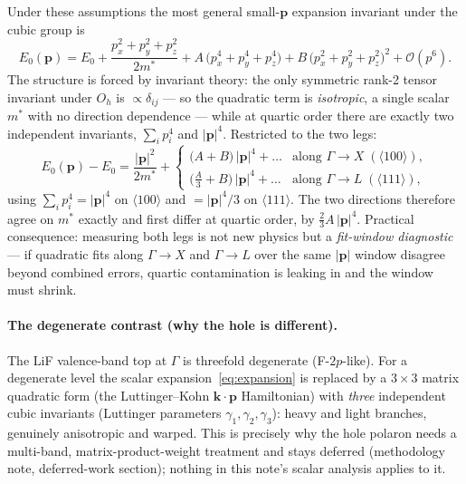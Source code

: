 \documentclass[11pt]{article}
\newcommand{\kv}{\mathbf{k}}
\newcommand{\pv}{\mathbf{p}}
\begin{document}
Under these assumptions the most general small-$\pv$ expansion invariant under the cubic
group is
\begin{equation}
E_{0}(\pv)
= E_{0}
+ \frac{p_{x}^{2}+p_{y}^{2}+p_{z}^{2}}{2m^{*}}
+ A\,\bigl(p_{x}^{4}+p_{y}^{4}+p_{z}^{4}\bigr)
+ B\,\bigl(p_{x}^{2}+p_{y}^{2}+p_{z}^{2}\bigr)^{2}
+ \mathcal{O}(p^{6}).
\label{eq:expansion}
\end{equation}
The structure is forced by invariant theory: the only symmetric rank-2 tensor invariant
under $O_{h}$ is $\propto\delta_{ij}$ --- so the quadratic term is \emph{isotropic}, a
single scalar $m^{*}$ with no direction dependence --- while at quartic order there are
exactly two independent invariants, $\sum_{i}p_{i}^{4}$ and $|\pv|^{4}$. Restricted to
the two legs:
\begin{equation}
E_{0}(\pv)-E_{0}
= \frac{|\pv|^{2}}{2m^{*}} +
\begin{cases}
\bigl(A+B\bigr)\,|\pv|^{4} + \dots & \text{along } \Gamma\to X \;(\langle100\rangle),\\[4pt]
\bigl(\tfrac{A}{3}+B\bigr)\,|\pv|^{4} + \dots & \text{along } \Gamma\to L \;(\langle111\rangle),
\end{cases}
\label{eq:legs}
\end{equation}
using $\sum_{i}p_{i}^{4}=|\pv|^{4}$ on $\langle100\rangle$ and $=|\pv|^{4}/3$ on
$\langle111\rangle$. The two directions therefore agree on $m^{*}$ exactly and first
differ at quartic order, by $\tfrac{2}{3}A\,|\pv|^{4}$. Practical consequence: measuring
both legs is not new physics but a \emph{fit-window diagnostic} --- if quadratic fits
along $\Gamma\to X$ and $\Gamma\to L$ over the same $|\pv|$ window disagree beyond
combined errors, quartic contamination is leaking in and the window must shrink.

\paragraph{The degenerate contrast (why the hole is different).} The LiF valence-band
top at $\Gamma$ is threefold degenerate (F-$2p$-like). For a degenerate level the scalar
expansion~\eqref{eq:expansion} is replaced by a $3\times3$ matrix quadratic form (the
Luttinger--Kohn $\kv\!\cdot\!\pv$ Hamiltonian) with \emph{three} independent cubic
invariants (Luttinger parameters $\gamma_{1},\gamma_{2},\gamma_{3}$): heavy and light
branches, genuinely anisotropic and warped. This is precisely why the hole polaron
needs a multi-band, matrix-product-weight treatment and stays deferred (methodology
note, deferred-work section); nothing in this note's scalar analysis applies to it.
\end{document}
